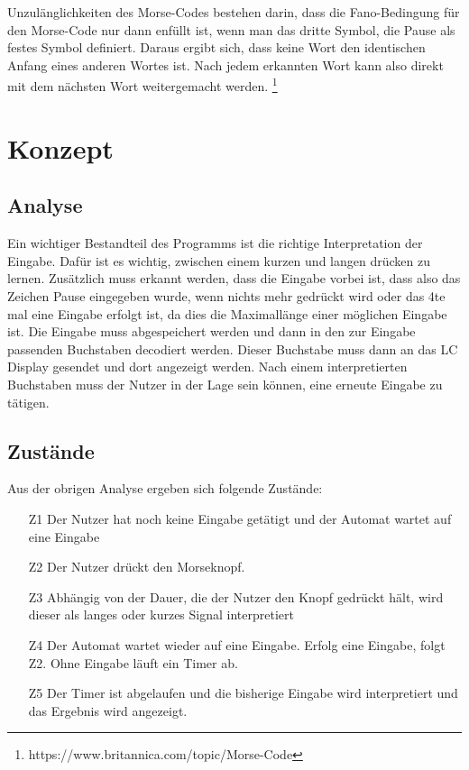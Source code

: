 \documentclass[a4paper,12pt]{article}
\begin{document}
	Unzulänglichkeiten des Morse-Codes bestehen darin, dass die Fano-Bedingung für den Morse-Code nur dann enfüllt ist, wenn man das dritte Symbol, die Pause als festes Symbol definiert. Daraus ergibt sich, dass keine Wort den identischen Anfang eines anderen Wortes ist. Nach jedem erkannten Wort kann also direkt mit dem nächsten Wort weitergemacht werden. \footnote{https://www.britannica.com/topic/Morse-Code}
	
	\newpage 
	\section{Konzept}
	\subsection{Analyse}
	Ein wichtiger Bestandteil des Programms ist die richtige Interpretation der Eingabe. Dafür ist es wichtig, zwischen einem kurzen und langen drücken zu lernen. Zusätzlich muss erkannt werden, dass die Eingabe vorbei ist, dass also das Zeichen Pause eingegeben wurde, wenn nichts mehr gedrückt wird oder das 4te mal eine Eingabe erfolgt ist, da dies die Maximallänge einer möglichen Eingabe ist. Die Eingabe muss abgespeichert werden und dann in den zur Eingabe passenden Buchstaben decodiert werden. Dieser Buchstabe muss dann an das LC Display gesendet und dort angezeigt werden. Nach einem interpretierten Buchstaben muss der Nutzer in der Lage sein können, eine erneute Eingabe zu tätigen.\\
	\subsection{Zustände}
	Aus der obrigen Analyse ergeben sich folgende Zustände:
	\begin{enumerate}
		\item[Z1] Der Nutzer hat noch keine Eingabe getätigt und der Automat wartet auf eine Eingabe
		\item[Z2] Der Nutzer drückt den Morseknopf.
		\item[Z3] Abhängig von der Dauer, die der Nutzer den Knopf gedrückt hält, wird dieser als langes oder kurzes Signal interpretiert
		\item[Z4] Der Automat wartet wieder auf eine Eingabe. Erfolg eine Eingabe, folgt Z2. Ohne Eingabe läuft ein Timer ab.
		\item[Z5] Der Timer ist abgelaufen und die bisherige Eingabe wird interpretiert und das Ergebnis wird angezeigt.
	\end{enumerate}
\end{document}
